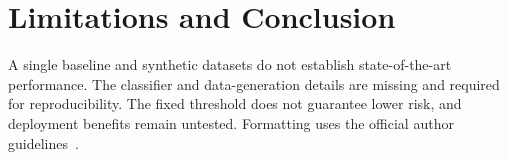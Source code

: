 \section{Limitations and Conclusion}
A single baseline and synthetic datasets do not establish state-of-the-art
performance. The classifier and data-generation details are
missing and required for reproducibility. The fixed threshold does not
guarantee lower risk, and deployment benefits remain untested.
Formatting uses the official author guidelines~\cite{formatguide}.
\label{pw:main-end}
